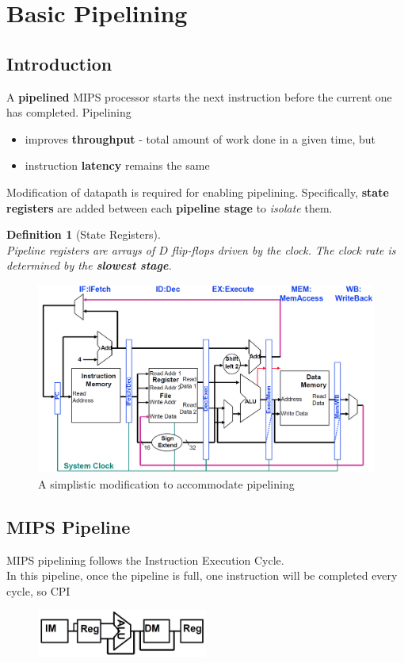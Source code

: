 \documentclass[12pt]{article}
\newtheorem{definition}{Definition}[section]
\theoremstyle{definition}
\begin{document}
\section{Basic Pipelining}
\subsection{Introduction}
A \textbf{pipelined} MIPS processor starts the next instruction before the current one has completed. Pipelining
\begin{itemize}
  \item improves \textbf{throughput} - total amount of work done in a given time, but
  \item instruction \textbf{latency} remains the same
\end{itemize}
Modification of datapath is required for enabling pipelining. Specifically, \textbf{state registers} are added between each \textbf{pipeline stage} to \textit{isolate} them.
\begin{definition}[State Registers]
\hfill\\\normalfont Pipeline registers are arrays of $D$ flip-flops driven by the clock. The clock rate is determined by the \textbf{slowest stage}.
\end{definition}
\begin{figure}[h]
\centering
\includegraphics[width = \textwidth]{13_1.png}
\caption{A simplistic modification to accommodate pipelining}
\end{figure}
\subsection{MIPS Pipeline}
MIPS pipelining follows the Instruction Execution Cycle.\\
In this pipeline, once the pipeline is full, one instruction will be completed every cycle, so CPI
\begin{figure}[h]
\centering
\includegraphics[width = 0.5\textwidth]{13_2.png}
\end{figure}
\end{document}
